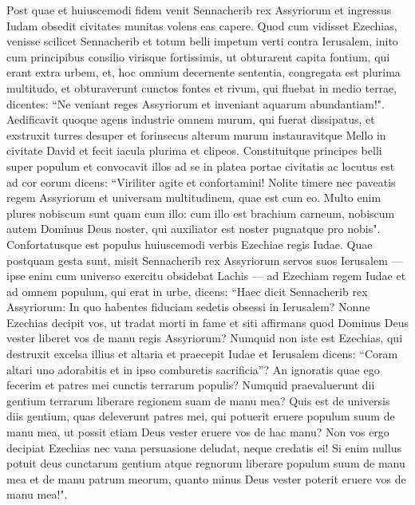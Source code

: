 \begin{biblechapter}  
\verse Post quae et huiuscemodi fidem venit Sennacherib rex Assyriorum et ingressus Iudam obsedit civitates munitas volens eas capere. 
\verse Quod cum vidisset Ezechias, venisse scilicet Sennacherib et totum belli impetum verti contra Ierusalem, 
\verse inito cum principibus consilio virisque fortissimis, ut obturarent capita fontium, qui erant extra urbem, et, hoc omnium decernente sententia, 
\verse congregata est plurima multitudo, et obturaverunt cunctos fontes et rivum, qui fluebat in medio terrae, dicentes: “Ne veniant reges Assyriorum et inveniant aquarum abundantiam!". 
\verse Aedificavit quoque agens industrie omnem murum, qui fuerat dissipatus, et exstruxit turres desuper et forinsecus alterum murum instauravitque Mello in civitate David et fecit iacula plurima et clipeos. 
\verse Constituitque principes belli super populum et convocavit illos ad se in platea portae civitatis ac locutus est ad cor eorum dicens: 
\verse “Viriliter agite et confortamini! Nolite timere nec paveatis regem Assyriorum et universam multitudinem, quae est cum eo. Multo enim plures nobiscum sunt quam cum illo: 
\verse cum illo est brachium carneum, nobiscum autem Dominus Deus noster, qui auxiliator est noster pugnatque pro nobis". Confortatusque est populus huiuscemodi verbis Ezechiae regis Iudae. 
\verse Quae postquam gesta sunt, misit Sennacherib rex Assyriorum servos suos Ierusalem — ipse enim cum universo exercitu obsidebat Lachis — ad Ezechiam regem Iudae et ad omnem populum, qui erat in urbe, dicens: 
\verse “Haec dicit Sennacherib rex Assyriorum: In quo habentes fiduciam sedetis obsessi in Ierusalem? 
\verse Nonne Ezechias decipit vos, ut tradat morti in fame et siti affirmans quod Dominus Deus vester liberet vos de manu regis Assyriorum? 
\verse Numquid non iste est Ezechias, qui destruxit excelsa illius et altaria et praecepit Iudae et Ierusalem dicens: “Coram altari uno adorabitis et in ipso comburetis sacrificia”? 
\verse An ignoratis quae ego fecerim et patres mei cunctis terrarum populis? Numquid praevaluerunt dii gentium terrarum liberare regionem suam de manu mea? 
\verse Quis est de universis diis gentium, quas deleverunt patres mei, qui potuerit eruere populum suum de manu mea, ut possit etiam Deus vester eruere vos de hac manu? 
\verse Non vos ergo decipiat Ezechias nec vana persuasione deludat, neque credatis ei! Si enim nullus potuit deus cunctarum gentium atque regnorum liberare populum suum de manu mea et de manu patrum meorum, quanto minus Deus vester poterit eruere vos de manu mea!". 

\end{biblechapter}
